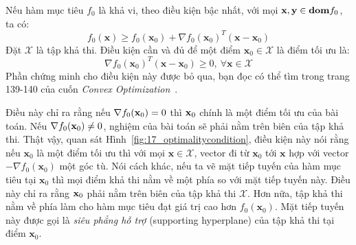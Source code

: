 Nếu hàm mục tiêu $f_0$ là khả vi, theo điều kiện bậc nhất, với mọi
$\mathbf{x}, \mathbf{y} \in \boldsymbol{\mathbf{dom}} f_0$, ta có:
\begin{equation}
f_0(\mathbf{x}) \geq f_0(\mathbf{x}_0) + \nabla f_0(\mathbf{x}_0)^T (\mathbf{x} - \mathbf{x}_0)
\end{equation}
Đặt $\mathcal{X}$ là tập khả thi. {Điều kiện cần và đủ} để một điểm $\mathbf{x}_0 \in \mathcal{X}$ là điểm tối ưu là:
\begin{equation}
\nabla f_0(\mathbf{x}_0)^T(\mathbf{x} - \mathbf{x}_0) \geq 0, ~\forall \mathbf{x} \in \mathcal{X}
\end{equation}
Phần chứng minh cho điều kiện này được bỏ qua, bạn đọc có thể tìm trong trang
139-140 của cuốn \textit{Convex Optimization}~\cite{boyd2004convex}.


Điều này chỉ ra rằng nếu $\nabla f_0(\mathbf{x}_0) = 0$ thì $\mathbf{x}_0$ chính là một điểm
tối ưu của bài toán. Nếu $\nabla f_0(\mathbf{x}_0) \neq 0$, nghiệm của bài toán sẽ
phải nằm trên biên của tập khả thi. Thật vậy, quan sát
Hình~\ref{fig:17_optimalitycondition}, điều kiện này nói rằng nếu $\mathbf{x}_0$
là một điểm tối ưu thì với mọi $\mathbf{x} \in \mathcal{X}$, vector đi từ
$\mathbf{x}_0$ tới $\mathbf{x}$ hợp với vector $-\nabla f_0 (\mathbf{x}_0)$ một
góc tù. Nói cách khác, nếu ta vẽ {mặt tiếp tuyến} của hàm mục tiêu tại
$\mathbf{x}_0$ thì mọi điểm {khả thi} nằm về một phía so với {mặt tiếp tuyến
này}. Điều này chỉ ra rằng $\mathbf{x}_0$ phải nằm trên biên của tập khả thi
$\mathcal{X}$. Hơn nữa, tập khả thi nằm về phía làm cho hàm mục tiêu đạt giá
trị cao
hơn $f_0(\mathbf{x}_0)$. Mặt tiếp tuyến này được gọi là \textit{siêu phẳng hỗ trợ} ({supporting hyperplane}) của tập khả thi tại điểm $\mathbf{x}_0$.

